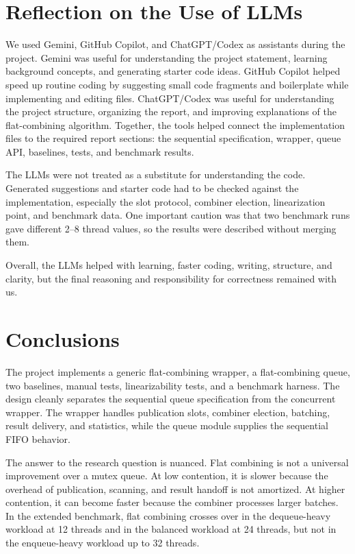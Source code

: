 \documentclass[11pt,a4paper]{article}
\begin{document}
\section{Reflection on the Use of LLMs}

We used Gemini, GitHub Copilot, and ChatGPT/Codex as assistants during the project. Gemini was useful for understanding the project statement, learning background concepts, and generating starter code ideas. GitHub Copilot helped speed up routine coding by suggesting small code fragments and boilerplate while implementing and editing files. ChatGPT/Codex was useful for understanding the project structure, organizing the report, and improving explanations of the flat-combining algorithm. Together, the tools helped connect the implementation files to the required report sections: the sequential specification, wrapper, queue API, baselines, tests, and benchmark results.

The LLMs were not treated as a substitute for understanding the code. Generated suggestions and starter code had to be checked against the implementation, especially the slot protocol, combiner election, linearization point, and benchmark data. One important caution was that two benchmark runs gave different 2--8 thread values, so the results were described without merging them.

Overall, the LLMs helped with learning, faster coding, writing, structure, and clarity, but the final reasoning and responsibility for correctness remained with us.

\section{Conclusions}
The project implements a generic flat-combining wrapper, a flat-combining queue, two baselines, manual tests, linearizability tests, and a benchmark harness. The design cleanly separates the sequential queue specification from the concurrent wrapper. The wrapper handles publication slots, combiner election, batching, result delivery, and statistics, while the queue module supplies the sequential FIFO behavior.

The answer to the research question is nuanced. Flat combining is not a universal improvement over a mutex queue. At low contention, it is slower because the overhead of publication, scanning, and result handoff is not amortized. At higher contention, it can become faster because the combiner processes larger batches. In the extended benchmark, flat combining crosses over in the dequeue-heavy workload at 12 threads and in the balanced workload at 24 threads, but not in the enqueue-heavy workload up to 32 threads.
\end{document}
